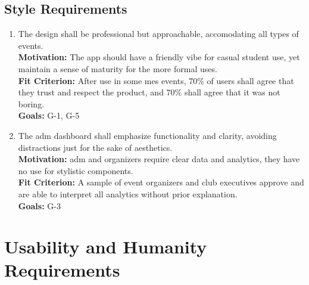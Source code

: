 \documentclass[12pt]{article}
\begin{document}
\subsection{Style Requirements}
\begin{enumerate}[label=\bfseries SR-\arabic*:, wide=0pt, leftmargin=*, 
  ref=\bfseries SR-\arabic*]
  \item \label{SR1} The design shall be professional but approachable, accomodating all types of events.\\[2mm]
    {\bf Motivation:} The app should have a friendly vibe for casual student use, yet maintain a sense of maturity for the more formal uses.\\
    {\bf Fit Criterion:} After use in some \Gls{mes} events, 70\% of users shall agree that they trust and respect the product, and 70\% shall agree that it was not boring.\\
    {\bf Goals:} G-1, G-5
  \item \label{SR2} The \gls{adm} dashboard shall emphasize functionality and clarity, avoiding distractions just for the sake of aesthetics.\\[2mm]
    {\bf Motivation:} \Gls{adm} and organizers require clear data and analytics, they have no use for stylistic components.\\
    {\bf Fit Criterion:} A sample of event organizers and club executives approve and are able to interpret all analytics without prior explanation.\\
    {\bf Goals:} G-3
\end{enumerate}

\section{Usability and Humanity Requirements}
\end{document}
